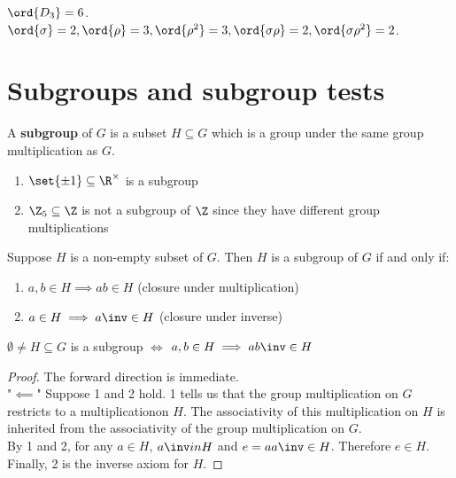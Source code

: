 \begin{example}
    $\ord{D_3} = 6$. \\
    $\ord{\sigma}=2, \ord{\rho}=3, \ord{\rho^2}=3, \ord{\sigma\rho}=2, \ord{\sigma\rho^2}=2$.
\end{example}

\section{Subgroups and subgroup tests}

\begin{definition}[a subgroup]
    A \textbf{subgroup} of $G$ is a subset $H \subseteq G$ which is a group under the same group multiplication as $G$.
\end{definition}

\newpage %
\begin{example}[subgroups]
    \spacebeforelist
    \begin{enumerate}
        \item $\set{\pm 1} \subseteq \R^\times$ is a subgroup
        \item $\Z_5 \subseteq \Z$ is not a subgroup of $\Z$ since they have different group multiplications
    \end{enumerate}
\end{example}

\begin{theorem}
    Suppose $H$ is a non-empty subset of $G$. Then $H$ is a subgroup of $G$ if and only if:
    \begin{enumerate}
        \item $a, b \in H \implies ab \in H$ (closure under multiplication)
        \item $a \in H \implies a\inv \in H$ (closure under inverse)
    \end{enumerate}
\end{theorem}

\begin{theorem}
    $\emptyset \neq H \subseteq G$ is a subgroup $\iff$ $a,b \in H \implies ab\inv \in H$
\end{theorem}

\begin{proof}
    The forward direction is immediate. \\
    "$\impliedby$" Suppose 1 and 2 hold. 1 tells us that the group multiplication on $G$ restricts to a multiplicationon $H$. The associativity of this multiplication on $H$ is inherited from the associativity of the group multiplication on $G$. \\
    By 1 and 2, for any $a \in H$, $a\inv in H$ and $e = a a\inv \in H$. Therefore $e \in H$. \\
    Finally, 2 is the inverse axiom for $H$.
\end{proof}

